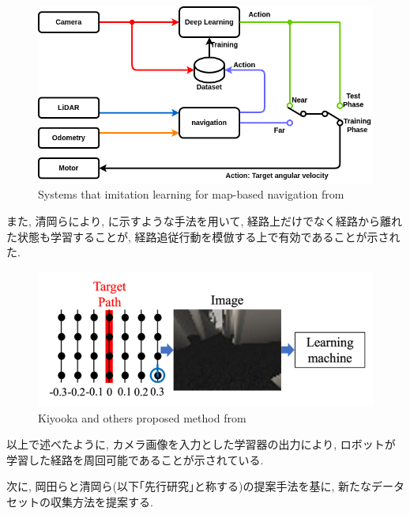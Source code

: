 \begin{figure}[h]
     \centering
     \includegraphics[keepaspectratio, scale=0.45]
     {images/okada-method.png}
     \caption{Systems that imitation learning for map-based navigation from \cite{okada-si}}
     \label{Fig:okada-method}
     \end{figure}

\newpage
また, 清岡ら\cite{kiyooka-si}により, に示すような手法を用いて, 経路上だけでなく経路から離れた状態も学習することが, 経路追従行動を模倣する上で有効であることが示された. 

\vspace{10mm}

\begin{figure}[h]
     \centering
     \includegraphics[keepaspectratio, scale=0.45]{images/kiyooka-si-1.png}
     \caption{Kiyooka and others proposed method from \cite{kiyooka-si}}
     \label{Fig:kiyooka-si}
     \end{figure}

\vspace{20mm}
以上で述べたように, カメラ画像を入力とした学習器の出力により, ロボットが学習した経路を周回可能であることが示されている. \par 次に, 岡田らと清岡ら(以下｢先行研究｣と称する)の提案手法を基に, 新たなデータセットの収集方法を提案する.

